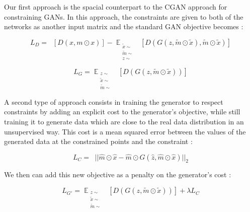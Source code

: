 \documentclass{article}
\begin{document}
		Our first approach is the spacial counterpart to the CGAN approach  for constraining GANs. In this approach, the constraints are given to both of the networks as another input matrix and the standard GAN objective becomes :
	
		\begin{equation}
			\label{cgan}
			L_{D}  = \mathop{\mathbb{{E}}_{\substack{
						x \sim \mathop{\mathbb{{P}}_{r}} \\
						m \sim \mathop{\mathbb{{P}}_{m}}
			}}} [D(x, m\odot x)] 
			- \mathop{\mathbb{{E}}}_{\substack{
					\tilde{x} \sim \mathop{\mathbb{{P}}_{r}} \\
					\tilde{m} \sim \mathop{\mathbb{{P}}_{m} }\\
					z \sim \mathop{\mathbb{{P}}_{z} }
			}} [D(G(z, \tilde{m}\odot\tilde{x}), \tilde{m}\odot\tilde{x})] 
		\end{equation}
		
		\begin{equation}
			L_{G}  = \mathop{\mathbb{{E}}}_{\substack{
					z \sim \mathop{\mathbb{{P}}_{z}} \\
					\tilde{x} \sim \mathop{\mathbb{{P}}_{r}} \\
					\tilde{m} \sim \mathop{\mathbb{{P}}_{m} }
			}} [D(G(z, \tilde{m}\odot\tilde{x}))] 
		\end{equation}
	
		A second type of approach consists in training the generator to respect constraints by adding an explicit cost to the generator's objective, while still training it to generate data which are close to the real data distribution in an unsupervised way. This cost is a mean squared error between the values of the generated data at the constrained points and the constraint :
	
		\begin{equation}
		\label{lc}
		L_C = \mathop{\mathbb{{E}}_{\substack{
					\hat{x} \sim \mathop{\mathbb{{P}}_{r}} \\
					\hat{z} \sim \mathop{\mathbb{{P}}_{z}}\\
					\hat{m} \sim \mathop{\mathbb{{P}}_{z}} \\	
		}}} || \hat{m} \odot \hat{x} - \hat{m} \odot G(\hat{z}, \hat{m} \odot \hat{x}) ||_2
		\end{equation}
		

		We then can add this new objective as a penalty on the generator's cost :

		
		\begin{equation}
		L_{G'} =  \mathop{\mathbb{{E}}}_{\substack{
				z \sim \mathop{\mathbb{{P}}_{z}} \\
				\tilde{x} \sim \mathop{\mathbb{{P}}_{r}} \\
				\tilde{m} \sim \mathop{\mathbb{{P}}_{m} }
		}} [D(G(z, \tilde{m}\odot\tilde{x}))]  + \lambda L_C
		\end{equation}
\end{document}
